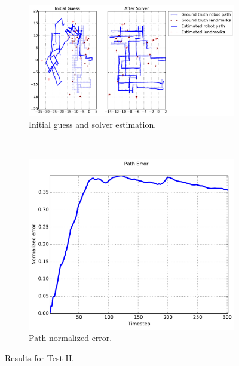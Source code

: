 {\begin{figure}[htbp!]
    \centering
    \begin{subfigure}[b]{\estWidth\textwidth}
        \includegraphics[width=\textwidth]{imagenes/tests/known/res_it_20_nl_40_op_100_oa_100_lp_100_ds_300_kw_1.pdf}
        \caption{Initial guess and solver estimation.}
        \label{fig:test-iia}
    \end{subfigure}\\
    \begin{subfigure}[b]{\errorWidth\textwidth}
        \includegraphics[width=\textwidth]{imagenes/tests/known/res_it_20_nl_40_op_100_oa_100_lp_100_ds_300_kw_1_path.pdf}
        \caption{Path normalized error.}
        \label{fig:test-iib}
    \end{subfigure}
    \caption{Results for Test II.}
    \label{fig:test-ii}
\end{figure}
}

